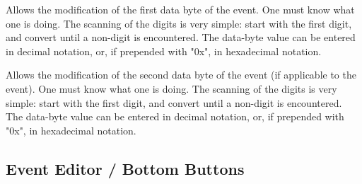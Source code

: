    Allows the modification of the first data byte of the event.
   One must know what one is doing.
   The scanning of the digits is very simple:  start with the first digit, and
   convert until a non-digit is encountered.  The data-byte value can be
   entered in decimal notation, or, if prepended with "0x", in hexadecimal
   notation.

   Allows the modification of the second data byte of the event (if applicable
   to the event).
   One must know what one is doing.
   The scanning of the digits is very simple:  start with the first digit, and
   convert until a non-digit is encountered.  The data-byte value can be
   entered in decimal notation, or, if prepended with "0x", in hexadecimal
   notation.

\subsection{Event Editor / Bottom Buttons}
\label{subsec:seq64_event_editor_buttons}

